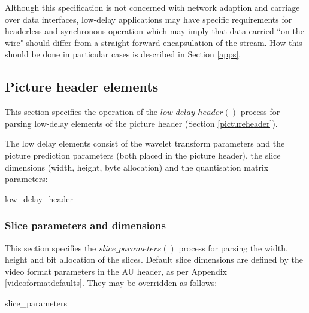Although this specification is not concerned with network adaption and carriage over data interfaces, low-delay
applications may have specific requirements for headerless and synchronous operation which may imply that
data carried ``on the wire" should differ from a straight-forward encapsulation of the stream. How this should
be done in particular cases is described in Section \ref{apps}.

\subsection{Picture header elements}
\label{ldpictureheader}

This section specifies the operation of the $low\_delay\_header()$ process for parsing low-delay elements
of the picture header (Section \ref{pictureheader}).

The low delay elements consist of the wavelet transform parameters and the picture
prediction parameters (both placed in the picture header), the slice dimensions 
(width, height, byte allocation) and the quantisation matrix parameters:

\begin{pseudo}{low\_delay\_header}{}
\end{pseudo}

\subsubsection{Slice parameters and dimensions}
\label{sliceparams}

This section specifies the $slice\_parameters()$ process for parsing the width, height and bit allocation of 
the slices. Default slice dimensions are defined by the video format parameters in the AU header, as per Appendix 
\ref{videoformatdefaults}. They may be overridden as follows:

\begin{pseudo}{slice\_parameters}{}
\bsEND
{}
\bsEND
\end{pseudo}

